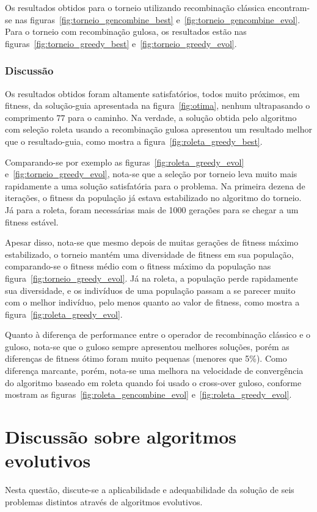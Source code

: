 \documentclass[a4paper]{article}
\begin{document}
Os resultados obtidos para o torneio utilizando recombinação clássica encontram-se nas figuras~\ref{fig:torneio_gencombine_best} e~\ref{fig:torneio_gencombine_evol}. Para o torneio com recombinação gulosa, os resultados estão nas figuras~\ref{fig:torneio_greedy_best} e~\ref{fig:torneio_greedy_evol}.

\subsubsection{Discussão}
Os resultados obtidos foram altamente satisfatórios, todos muito próximos, em fitness, da solução-guia apresentada na figura~\ref{fig:otima}, nenhum ultrapasando o comprimento $77$ para o caminho. Na verdade, a solução obtida pelo algoritmo com seleção roleta usando a recombinação gulosa apresentou um resultado melhor que o resultado-guia, como mostra a figura~\ref{fig:roleta_greedy_best}.

Comparando-se por exemplo as figuras~\ref{fig:roleta_greedy_evol} e~\ref{fig:torneio_greedy_evol}, nota-se que a seleção por torneio leva muito mais rapidamente a uma solução satisfatória para o problema. Na primeira dezena de iterações, o fitness da população já estava estabilizado no algoritmo do torneio. Já para a roleta, foram necessárias mais de 1000 gerações para se chegar a um fitness estável. 

Apesar disso, nota-se que mesmo depois de muitas gerações de fitness máximo estabilizado, o torneio mantém uma diversidade de fitness em sua população, comparando-se o fitness médio com o fitness máximo da população nas figura~\ref{fig:torneio_greedy_evol}. Já na roleta, a população perde rapidamente sua diversidade, e os indivíduos de uma população passam a se parecer muito com o melhor indivíduo, pelo menos quanto ao valor de fitness, como mostra a figura~\ref{fig:roleta_greedy_evol}.

Quanto à diferença de performance entre o operador de recombinação clássico e o guloso, nota-se que o guloso sempre apresentou melhores soluções, porém as diferenças de fitness ótimo foram muito pequenas (menores que 5\%). Como diferença marcante, porém, nota-se uma melhora na velocidade de convergência do algoritmo baseado em roleta quando foi usado o cross-over guloso, conforme mostram as figuras~\ref{fig:roleta_gencombine_evol} e~\ref{fig:roleta_greedy_evol}.


\section{Discussão sobre algoritmos evolutivos}
Nesta questão, discute-se a aplicabilidade e adequabilidade da solução de seis problemas distintos através de algoritmos evolutivos.
\end{document}
